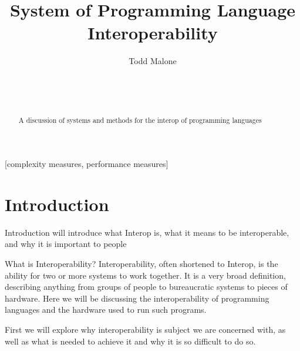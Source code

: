 \documentclass{sig-alternate}
\begin{document}

\title{System of Programming Language Interoperability}

\author{
\alignauthor
Todd Malone\\
	\\
	\\
	\\
}

\maketitle
\begin{abstract}
A discussion of systems and methods for the interop of programming languages
\end{abstract}

[complexity measures, performance measures]



\section{Introduction}
Introduction will introduce what Interop is, what it means to be interoperable, and
why it is important to people

What is Interoperability? Interoperability, often shortened to Interop, is the ability for two or more systems to work together. It is a very broad definition, describing anything from groups of people to bureaucratic systems to pieces of hardware. Here we will be discussing the interoperability of programming languages and the hardware used to run such programs.

First we will explore why interoperability is subject we are concerned with, as well as what is needed to achieve it and why it is so difficult to do so.
\end{document}
